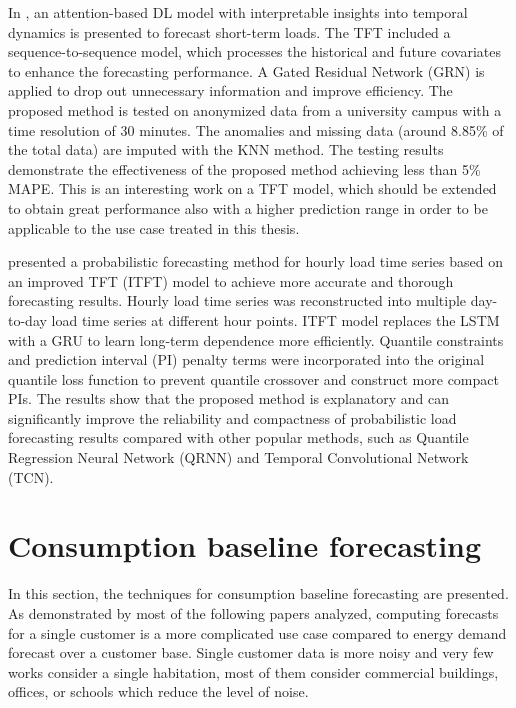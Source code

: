 In \cite{10033079}, an attention-based DL model with interpretable insights into temporal dynamics is presented to forecast short-term loads.
The TFT included a sequence-to-sequence model, which processes the historical and future covariates to enhance the forecasting performance.
A Gated Residual Network (GRN) is applied to drop out unnecessary information and improve efficiency.
The proposed method is tested on anonymized data from a university campus with a time resolution of 30 minutes.
The anomalies and missing data (around 8.85\% of the total data) are imputed with the KNN method.
The testing results demonstrate the effectiveness of the proposed method achieving less than 5\% MAPE.
This is an interesting work on a TFT model, which should be extended to obtain great performance also with a higher prediction range in order to be applicable to the use case treated in this thesis.

\cite{LI2023108743} presented a probabilistic forecasting method for hourly load time series based on an improved TFT (ITFT) model to achieve more accurate and thorough forecasting results.
Hourly load time series was reconstructed into multiple day-to-day load time series at different hour points.
ITFT model replaces the LSTM with a GRU to learn long-term dependence more efficiently.
Quantile constraints and prediction interval (PI) penalty terms were incorporated into the original quantile loss function to prevent quantile crossover and construct more compact PIs.
The results show that the proposed method is explanatory and can significantly improve the reliability and compactness of probabilistic load forecasting results compared with other popular methods, such as Quantile Regression Neural Network (QRNN) and Temporal Convolutional Network (TCN).


\section{Consumption baseline forecasting}
\label{sec:baselinesoa}
\vspace{0.2 cm}

In this section, the techniques for consumption baseline forecasting are presented.
As demonstrated by most of the following papers analyzed, computing forecasts for a single customer is a more complicated use case compared to energy demand forecast over a customer base.
Single customer data is more noisy and very few works consider a single habitation, most of them consider commercial buildings, offices, or schools which reduce the level of noise.

